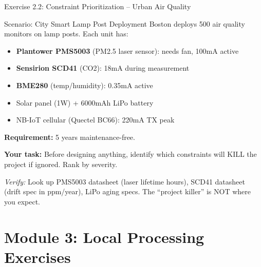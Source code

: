 \documentclass[aspectratio=169,11pt]{beamer}
\begin{document}
\begin{frame}{Exercise 2.2: Constraint Prioritization -- Urban Air Quality}
    \begin{block}{Scenario: City Smart Lamp Post Deployment}
        Boston deploys 500 air quality monitors on lamp posts. Each unit has:
        \begin{itemize}
            \item \textbf{Plantower PMS5003} (PM2.5 laser sensor): needs fan, 100mA active
            \item \textbf{Sensirion SCD41} (CO2): 18mA during measurement
            \item \textbf{BME280} (temp/humidity): 0.35mA active
            \item Solar panel (1W) + 6000mAh LiPo battery
            \item NB-IoT cellular (Quectel BC66): 220mA TX peak
        \end{itemize}
        
        \vspace{0.2cm}
        \textbf{Requirement:} 5 years maintenance-free.
        
        \textbf{Your task:} Before designing anything, identify which constraints will KILL the project if ignored. Rank by severity.
    \end{block}
    
    {\footnotesize \textit{Verify:} Look up PMS5003 datasheet (laser lifetime hours), SCD41 datasheet (drift spec in ppm/year), LiPo aging specs. The ``project killer'' is NOT where you expect.}
\end{frame}

\section{Module 3: Local Processing Exercises}
\end{document}
